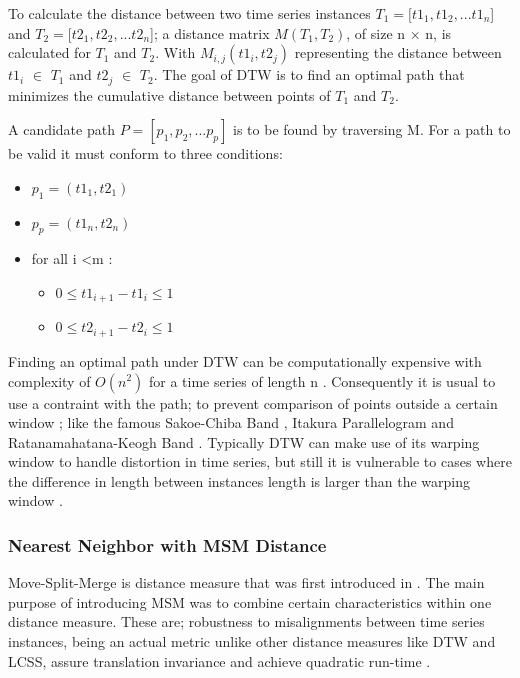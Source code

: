 To calculate the distance between two time series instances  $T_{1} = [t1_{1},t1_{2},...t1_{n}$]
and $T_{2} = [t2_{1},t2_{2},...t2_{n}$];
a distance matrix $M(T_{1},T_{2})$, of size n $\times$ n, is calculated for $T_{1}$ and $T_{2}$.
With $M_{i,j}(t1_{i},t2_{j})$ representing the distance between $t1_{i}$ $\in$ $T_{1}$
and $t2_{j}$ $\in$ $T_{2}$.
The goal of DTW is to find an optimal path that minimizes the cumulative distance between points of $T_{1}$ and $T_{2}$.

A candidate path $P = [p_{1},p_{2},...p_{p}]$ is to be found by traversing M.
For a path to be valid it must conform to three conditions:
\begin{itemize}
    \item $p_{1} = (t1_{1},t2_{1})$
    \item $p_{p} = (t1_{n},t2_{n})$
    \item for all i \textless m :
        \begin{itemize}
            \item $0 \leq t1_{i+1} - t1_{i} \leq 1$
            \item $0 \leq t2_{i+1} - t2_{i} \leq 1$
        \end{itemize}
\end{itemize}

Finding an optimal path under DTW can be computationally expensive with complexity of $O(n^2)$ for a time series of length n \cite{schafer2017fast,petitjean2016faster}.
Consequently it is usual to use a contraint with the path; to prevent comparison of points outside a certain window \cite{tan2020fastee}; like the famous Sakoe-Chiba Band \cite{sakoe1978dynamic}, Itakura Parallelogram \cite{itakura1975minimum} and Ratanamahatana-Keogh Band \cite{ratanamahatana2004making}.
Typically DTW can make use of its warping window to handle distortion in time series,
but still it is vulnerable to cases where the difference in length between instances length is larger than the warping window \cite{tan2019time}.

\subsubsection{Nearest Neighbor with MSM Distance}
\label{SubsubsectionMSM}
Move-Split-Merge is distance measure that was first introduced in \cite{stefan2012move}.
The main purpose of introducing MSM was to combine certain characteristics within one distance measure.
These are; robustness to misalignments between time series instances, being an actual metric unlike other distance measures like DTW and LCSS,
assure translation invariance and achieve quadratic run-time \cite{lines2015time}.

